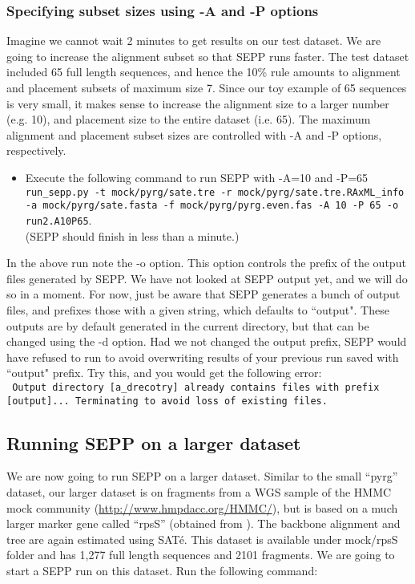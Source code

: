 \documentclass[11pt]{article} %
\newcommand{\sepp}{SEPP\xspace}
\newcommand{\ins}[1]{{\tt #1}}
\newcommand{\file}[1]{{\sf #1}}
\newcommand{\sate}{SAT\'{e}\xspace}
\begin{document}
\subsubsection{Specifying subset sizes using -A and -P options}
Imagine we cannot wait 2 minutes to get results on our test dataset. We are going to increase the alignment subset so that \sepp runs faster. The test dataset included 65 full length sequences, and hence the 10\% rule amounts to alignment and placement subsets of maximum size 7. Since our toy example of 65 sequences is very small, it makes sense to increase the alignment size to a larger number (e.g. 10), and placement size to the entire dataset (i.e. 65). The maximum alignment and placement subset sizes are controlled with -A and -P options, respectively. 

\begin{itemize}
\item Execute the following command to run \sepp with -A=10 and -P=65\\

\ins{run\_sepp.py -t mock/pyrg/sate.tre -r mock/pyrg/sate.tre.RAxML\_info -a mock/pyrg/sate.fasta -f mock/pyrg/pyrg.even.fas -A 10 -P 65 -o run2.A10P65}. \\

(\sepp should finish in less than a minute.)
\end{itemize}

In the above run note the -o option. This option controls the prefix of the output files generated by \sepp. We have not looked at \sepp output yet, and we will do so in a moment. For now, just be aware that \sepp generates a bunch of output files, and prefixes those with a given string, which defaults to ``output". These outputs are by default generated in the current directory, but that can be changed using the -d option. Had we not changed the output prefix, \sepp would have refused to run to avoid overwriting results of your previous run saved with ``output" prefix. Try this, and you would get the following error:\\

\ins{ Output directory [a\_drecotry] already contains files with prefix [output]...
Terminating to avoid loss of existing files.
}


\subsection{Running \sepp on a larger dataset}
We are now going to run \sepp on a larger dataset. 
Similar to the small ``pyrg'' dataset, our larger dataset is on fragments from a WGS sample of the HMMC mock community (\url{http://www.hmpdacc.org/HMMC/}), 
but is based on a much larger marker gene called ``rpsS'' (obtained from \cite{metaphyler}).
The backbone alignment and tree are again estimated using \sate. 
This dataset is available under \file{mock/rpsS} folder and has 1,277 full length sequences and 2101 fragments. 
We are going to start a \sepp run on this dataset. Run the following command:\\
\end{document}
